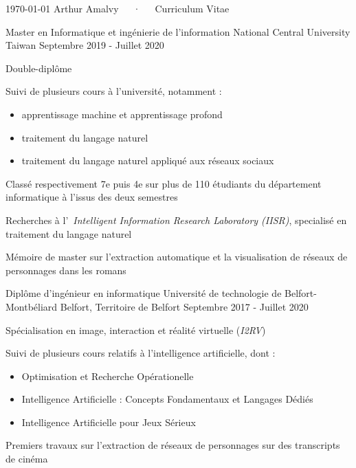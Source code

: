 \documentclass[12pt, a4paper]{awesome-cv}
\begin{document}
\makecvheader

\makecvfooter
  {\today}
  {Arthur Amalvy~~~·~~~Curriculum Vitae}
  {\thepage}




\begin{cventries}

  \cventry
  {Master en Informatique et ingénierie de l'information} %
  {National Central University} %
  {Taiwan} %
  {Septembre 2019 - Juillet 2020} %
  {
    \begin{cvitems} %
      \item Double-diplôme
      \item Suivi de plusieurs cours à l'université, notamment :
        \begin{itemize}
          \item apprentissage machine et apprentissage profond 
          \item traitement du langage naturel
          \item traitement du langage naturel appliqué aux réseaux sociaux 
        \end{itemize}
      \item Classé respectivement 7e puis 4e sur plus de 110 étudiants du département informatique à l'issus des deux semestres
      \item Recherches à l'~\textit{Intelligent Information Research Laboratory (IISR)}, specialisé en traitement du langage naturel
      \item Mémoire de master sur l'extraction automatique et la visualisation de réseaux de personnages dans les romans
    \end{cvitems}
  }

  \cventry
  {Diplôme d'ingénieur en informatique}
  {Université de technologie de Belfort-Montbéliard}
  {Belfort, Territoire de Belfort}
  {Septembre 2017 - Juillet 2020}
  {
    \begin{cvitems}
      \item Spécialisation en image, interaction et réalité virtuelle (\textit{I2RV})
      \item Suivi de plusieurs cours relatifs à l'intelligence artificielle, dont :
        \begin{itemize}
          \item Optimisation et Recherche Opérationelle
          \item Intelligence Artificielle : Concepts Fondamentaux et Langages Dédiés
          \item Intelligence Artificielle pour Jeux Sérieux 
        \end{itemize}
      \item Premiers travaux sur l'extraction de réseaux de personnages sur des transcripts de cinéma
    \end{cvitems}
  }


\end{cventries}
\end{document}
